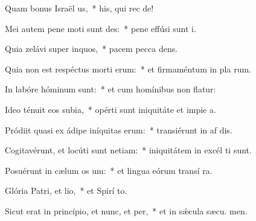 \item Quam bonus Israël us,~* his, qui rec  de!
\item Mei autem pene moti sunt des:~* pene effúsi sunt  i.
\item Quia zelávi super inquos,~* pacem pecca dens.
\item Quia non est respéctus morti erum:~* et firmaméntum in pla rum.
\item In labóre hóminum  sunt:~* et cum homínibus non flatur:
\item Ideo ténuit eos subia,~* opérti sunt iniquitáte et impie a.
\item Pródiit quasi ex ádipe iníquitas erum:~* transiérunt in af dis.
\item Cogitavérunt, et locúti sunt netiam:~* iniquitátem in excél ti sunt.
\item Posuérunt in cælum os um:~* et lingua eórum transí  ra.
\item Glória Patri, et lio,~* et Spirí to.
\item Sicut erat in princípio, et nunc, et per,~* et in sǽcula sæcu. men.
